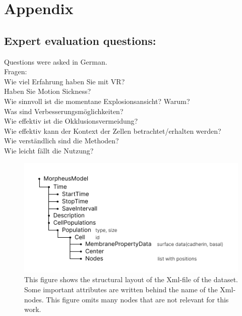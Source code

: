 \chapter{Appendix}
\label{sec:appendix}

\section{Expert evaluation questions:}
\label{ExpertQuestions}
Questions were asked in German. \\
Fragen: \\
Wie viel Erfahrung haben Sie mit VR? \\
Haben Sie Motion Sickness? \\
Wie sinnvoll ist die momentane Explosionsansicht? Warum? \\
Was sind Verbesserungsmöglichkeiten? \\
Wie effektiv ist die Okklusionsvermeidung? \\
Wie effektiv kann der Kontext der Zellen betrachtet/erhalten werden? \\
Wie verständlich sind die Methoden? \\
Wie leicht fällt die Nutzung? \\

\begin{figure}[h]
	\centering
	\includegraphics[width=1\linewidth]{fig/Images/DataLayout}
	\caption[]{This figure shows the structural layout of the Xml-file of the dataset. Some important attributes are written behind the name of the Xml-nodes. This figure omits many nodes that are not relevant for this work. }
	\label{fig:DataLayout}
\end{figure}

